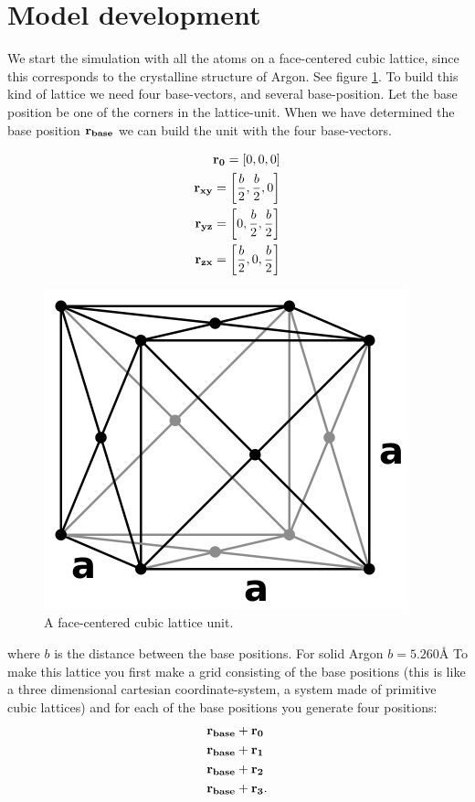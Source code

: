 \section{Model development}
We start the simulation with all the atoms on a face-centered cubic lattice, since this corresponds to the crystalline structure of Argon. See figure \ref{face_lattice}.
To build this kind of lattice we need four base-vectors, and several base-position. Let the base position be one of the corners in the lattice-unit. When we have determined the base position $\bf r_{base}$ we can build the 
unit with the four base-vectors.

\begin{align}
 {\bf r_0} = \left[0,0,0\right]\nonumber \\
 {\bf r_{xy}} = \left[\frac{b}{2}, \frac{b}{2}, 0\right]\nonumber \\
 {\bf r_{yz}} = \left[0, \frac{b}{2}, \frac{b}{2}\right]\nonumber \\
 {\bf r_{zx}} = \left[\frac{b}{2}, 0, \frac{b}{2}\right]\nonumber \\
\end{align}
\begin{figure}[H]
 \centering
 \includegraphics[width=9 cm]{./figures/face_lattice.png}
 \caption{A face-centered cubic lattice unit.}
 \label{face_lattice}
\end{figure}
where $b$ is the distance between the base positions. For solid Argon  $b=5.260 Å$ To make this lattice you first make a grid consisting of the base positions (this is like a three dimensional cartesian coordinate-system, a system made of primitive cubic lattices) and
for each of the base positions you generate four positions:
\begin{align}
&{\bf r_{base} + r_0}\nonumber \\ 
&{\bf r_{base} + r_1}\nonumber \\ 
&{\bf r_{base} + r_2}\nonumber \\ 
&{\bf r_{base} + r_3} \nonumber. \\
\end{align}
